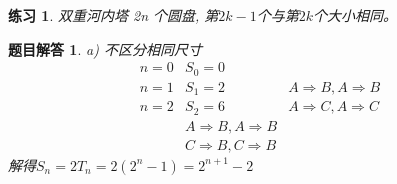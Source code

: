 \documentclass[mode=geye]{elegantnote}
\newtheorem{exercise}{练习}
\newtheorem{answer}{题目解答}
\begin{document}
\begin{exercise}
	双重河内塔 2n 个圆盘, 第$ 2k-1 $个与第$ 2k $个大小相同。
\end{exercise}

\begin{answer}
	a) 不区分相同尺寸
	\begin{equation*}
		\begin{aligned}
			n=0 & S_0=0	& \\
			n=1 & S_1=2	& A \Rightarrow B, A \Rightarrow B\\
			n=2 & S_2=6	& A \Rightarrow C, A \Rightarrow C\\
						& A \Rightarrow B, A \Rightarrow B\\
						& C \Rightarrow B, C \Rightarrow B
		\end{aligned}
	\end{equation*}
	解得$ S_n = 2T_n = 2(2^n-1)=2^{n+1}-2 $
	

\end{answer}
\end{document}
